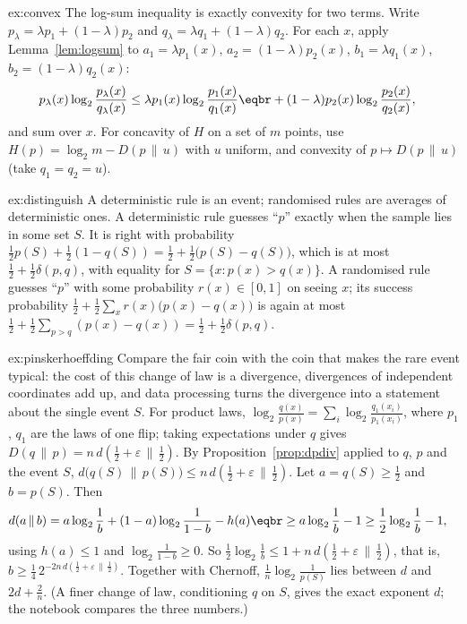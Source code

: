 \begin{solution}{ex:convex}
\idea The log-sum inequality is exactly convexity for two terms.
\writeup Write $p_\lambda=\lambda p_1+(1-\lambda)p_2$ and $q_\lambda=\lambda q_1+(1-\lambda)q_2$. For each $x$, apply Lemma~\ref{lem:logsum} to $a_1=\lambda p_1(x)$, $a_2=(1-\lambda)p_2(x)$, $b_1=\lambda q_1(x)$, $b_2=(1-\lambda)q_2(x)$:
\[
\begin{aligned}p_\lambda(x)\log_2\frac{p_\lambda(x)}{q_\lambda(x)}&\le\lambda p_1(x)\log_2\frac{p_1(x)}{q_1(x)}\eqbr+(1-\lambda)p_2(x)\log_2\frac{p_2(x)}{q_2(x)},\end{aligned}
\]
and sum over $x$. For concavity of $H$ on a set of $m$ points, use $H(p)=\log_2m-D(p\,\|\,u)$ with $u$ uniform, and convexity of $p\mapsto D(p\,\|\,u)$ (take $q_1=q_2=u$).
\end{solution}

\begin{solution}{ex:distinguish}
\idea A deterministic rule is an event; randomised rules are averages of deterministic ones.
\writeup A deterministic rule guesses ``$p$'' exactly when the sample lies in some set $S$. It is right with probability $\frac12p(S)+\frac12(1-q(S))=\frac12+\frac12\bigl(p(S)-q(S)\bigr)$, which is at most $\frac12+\frac12\delta(p,q)$, with equality for $S=\{x:p(x)>q(x)\}$. A randomised rule guesses ``$p$'' with some probability $r(x)\in[0,1]$ on seeing $x$; its success probability $\frac12+\frac12\sum_xr(x)\bigl(p(x)-q(x)\bigr)$ is again at most $\frac12+\frac12\sum_{p>q}(p(x)-q(x))=\frac12+\frac12\delta(p,q)$.
\end{solution}

\begin{solution}{ex:pinskerhoeffding}
\idea Compare the fair coin with the coin that makes the rare event typical: the cost of this change of law is a divergence, divergences of independent coordinates add up, and data processing turns the divergence into a statement about the single event $S$.
\writeup For product laws, $\log_2\frac{q(x)}{p(x)}=\sum_i\log_2\frac{q_1(x_i)}{p_1(x_i)}$, where $p_1$, $q_1$ are the laws of one flip; taking expectations under $q$ gives $D(q\,\|\,p)=n\,d(\frac12+\varepsilon\,\|\,\frac12)$. By Proposition~\ref{prop:dpdiv} applied to $q$, $p$ and the event $S$, $d\bigl(q(S)\,\|\,p(S)\bigr)\le n\,d(\frac12+\varepsilon\,\|\,\frac12)$. Let $a=q(S)\ge\frac12$ and $b=p(S)$. Then
\[
\begin{aligned}d(a\,\|\,b)&=a\log_2\frac1b+(1-a)\log_2\frac1{1-b}-h(a)\eqbr\ge a\log_2\frac1b-1\ge\frac12\log_2\frac1b-1,\end{aligned}
\]
using $h(a)\le1$ and $\log_2\frac1{1-b}\ge0$. So $\frac12\log_2\frac1b\le1+n\,d(\frac12+\varepsilon\,\|\,\frac12)$, that is, $b\ge\frac14\,2^{-2n\,d(\frac12+\varepsilon\,\|\,\frac12)}$. Together with Chernoff, $\frac1n\log_2\frac1{p(S)}$ lies between $d$ and $2d+\frac2n$. (A finer change of law, conditioning $q$ on $S$, gives the exact exponent $d$; the notebook compares the three numbers.)
\end{solution}

